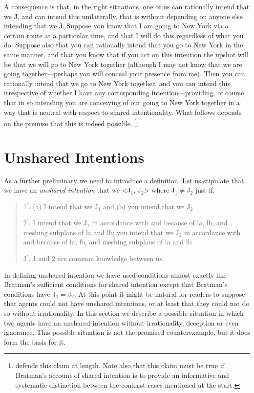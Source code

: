 \documentclass[12pt,\papersize]{extarticle}
\begin{document}
A consequence is that, in the right situations, one of us can rationally intend that we J, and can intend this unilaterally, that is without depending on anyone else intending that we J. 
Suppose you know that I am going to New York via a certain route at a particular time, 
and that I will do this regardless of what you do.
Suppose also that you can rationally intend that you go to New York in the same manner,
and that you know that if you act on this intention the upshot will be that we will go to New York together (although I may not know that we are going together---perhaps you will conceal your presence from me).
Then you can rationally intend that we go to New York together, 
	and you can intend this irrespective of whether I have any corresponding intention---providing, of course, that in so intending you are conceiving of our going to New York together in a way that is neutral with respect to shared intentionality.
What follows depends on the premise that this is indeed possible.%
\footnote{ 
\citet{Bratman:1999fr}  defends this claim at length. 
Note also that this claim must be true if Bratman's account of shared intention is to provide an informative and systematic distinction between the contrast cases mentioned at the start.
}


\section{Unshared Intentions}
\label{sec:unshared_intentions}
As a further preliminary we need to introduce a definition.
Let us stipulate that we have an \emph{unshared intention} that we <J$_1$, J$_2$> where J$_1$$\neq$J$_2$ just if:
%
\begin{quote}
\label{df:unshared_intention}
1$^\prime$. (a) I intend that we J$_1$ and (b) you intend that we J$_2$
 
2$^\prime$. I intend that we J$_1$ in accordance with and because of la, lb, and meshing subplans of la and lb; you intend that we J$_2$ in accordance with and because of la, lb, and meshing subplans of la and lb
 
3$^\prime$. 1 and 2 are common knowledge between us.
\end{quote}
In defining unshared intention we have used conditions almost exactly like Bratman's sufficient conditions for shared intention except that Bratman's conditions have J$_1$$=$J$_2$.
At this point it might be natural for readers to suppose that agents could not have unshared intentions,
or at least that they could not do so without irrationality.
In this section we describe a possible situation in which two agents  have an unshared intention without irrationality, deception or even ignorance.
This possible situation is not the promised counterexample, but it does form the basis for it.
\end{document}
